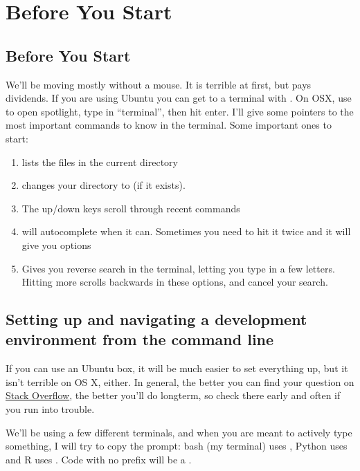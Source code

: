 \chapter{Before You Start}

\section{Before You Start}
We'll be moving mostly without a mouse. It is terrible at first, but pays dividends.
If you are using Ubuntu you can get to a terminal with . On OSX,
use  to open spotlight, type in ``terminal'', then hit 
enter. I'll give some pointers to the most important commands to 
know in the terminal. Some important ones to start:

\begin{enumerate}
  \item {} lists the files in the current directory
  \item {} changes your directory to 
    (if it exists).
  \item The up/down keys scroll through recent commands
  \item {} will autocomplete when it can. Sometimes you need to 
    hit it twice and it will give you options
  \item {} Gives you reverse search in the terminal, letting 
    you type in a few letters. Hitting  more scrolls 
    backwards in these options, and  cancel your search.
\end{enumerate}

\section{Setting up and navigating a development environment from the command 
  line}
If you can use an Ubuntu box, it will be much easier to set everything up, but 
it isn't terrible on OS X, either. In general, the better you can find your 
question on \href{http://stackoverflow.com/}{Stack Overflow}, the better you'll do
longterm, so check there early and often if you run into trouble.

We'll be using a few different terminals, and when you are meant to actively 
type something, I will try to copy the prompt: bash (my terminal) uses 
\bash{}, Python uses \py{} and R uses \R{}. Code with no prefix will be a 
.


